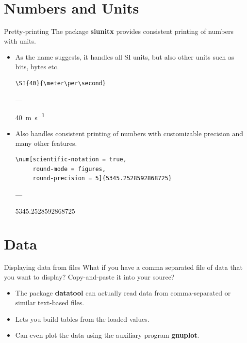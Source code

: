 \documentclass[english]{beamer}
\begin{document}

\section{Numbers and Units}

\begin{frame}[fragile]{\insertsection}{Pretty-printing}
  The package \textbf{siunitx} provides consistent printing of numbers
  with units.
  \begin{itemize}
  \item As the name suggests, it handles all SI units, but also other
    units such as bits, bytes etc.
\begin{verbatim}
\SI{40}{\meter\per\second}
\end{verbatim}
    ---
    
    \SI{40}{\meter\per\second}
  \item Also handles consistent printing of numbers with
    customizable precision and many other features.
\begin{verbatim}
\num[scientific-notation = true,
     round-mode = figures,
     round-precision = 5]{5345.2528592868725}
\end{verbatim}
    ---
    
    \num[scientific-notation = true, round-mode = figures,
    round-precision = 5]{5345.2528592868725}
  \end{itemize}
\end{frame}

\section{Data}

\begin{frame}{\insertsection}{Displaying data from files}
  What if you have a comma separated file of data that you want to
  display? Copy-and-paste it into your source?
  \begin{itemize}
  \item The package \textbf{datatool} can actually read data from
    comma-separated or similar text-based files.
  \item Lets you build tables from the loaded values.
  \item Can even plot the data using the auxiliary program
    \textbf{gnuplot}.
  \end{itemize}
\end{frame}
\end{document}
